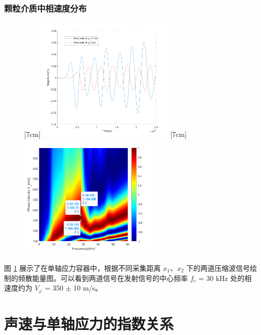 \subsubsection{颗粒介质中相速度分布}


\begin{figure}[!hbtp]
  \centering
                [7cm]{\includegraphics[height=6cm]{figures/2_wave_train.png}}
  \hspace{1cm}
                [7cm]{\includegraphics[height=6cm]{figures/2_cwt_v_phi.png}}
  \label{fig:dispersion_energy}
\end{figure}

图 \ref{fig:dispersion_energy} 展示了在单轴应力容器中，根据不同采集距离 $x_{1}$、$x_{2}$ 下的两道压缩波信号绘制的频散能量图。可以看到两道信号在发射信号的中心频率 $f_{c}$ = 30 \unit{\kilo\hertz} 处的相速度约为 $V_{\varphi}$ = 350 $\pm$ 10 \unit{\meter}/\unit{\second}。

\section{声速与单轴应力的指数关系}


